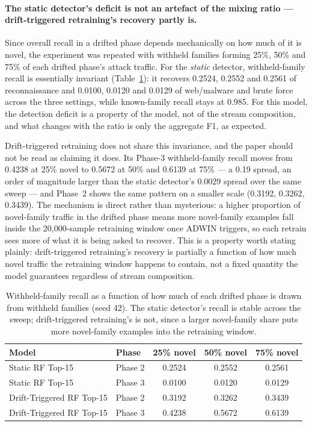 \documentclass[11pt,a4paper]{article}
\begin{document}
\paragraph{The static detector's deficit is not an artefact of the mixing
ratio --- drift-triggered retraining's recovery partly is.} Since overall
recall in a drifted phase depends mechanically on how much of it is novel, the
experiment was repeated with withheld families forming 25\%, 50\% and 75\% of
each drifted phase's attack traffic. For the \emph{static} detector,
withheld-family recall is essentially invariant (Table~\ref{tab:sweep}): it
recovers 0.2524, 0.2552 and 0.2561 of reconnaissance and 0.0100, 0.0120 and
0.0129 of web/malware and brute force across the three settings, while
known-family recall stays at 0.985. For this model, the detection deficit is a
property of the model, not of the stream composition, and what changes with
the ratio is only the aggregate F1, as expected.

Drift-triggered retraining does not share this invariance, and the paper
should not be read as claiming it does. Its Phase-3 withheld-family recall
moves from 0.4238 at 25\% novel to 0.5672 at 50\% and 0.6139 at 75\% --- a
0.19 spread, an order of magnitude larger than the static detector's 0.0029
spread over the same sweep --- and Phase~2 shows the same pattern on a smaller
scale (0.3192, 0.3262, 0.3439). The mechanism is direct rather than
mysterious: a higher proportion of novel-family traffic in the drifted phase
means more novel-family examples fall inside the 20{,}000-sample retraining
window once ADWIN triggers, so each retrain sees more of what it is being
asked to recover. This is a property worth stating plainly: drift-triggered
retraining's recovery is partially a function of how much novel traffic the
retraining window happens to contain, not a fixed quantity the model
guarantees regardless of stream composition.

\begin{table}[!ht]
\centering
\caption{Withheld-family recall as a function of how much of each drifted phase
is drawn from withheld families (seed 42). The static detector's recall is
stable across the sweep; drift-triggered retraining's is not, since a larger
novel-family share puts more novel-family examples into the retraining
window.}
\label{tab:sweep}
\small
\begin{tabular}{llccc}
\toprule
\textbf{Model} & \textbf{Phase} & \textbf{25\% novel} & \textbf{50\% novel} & \textbf{75\% novel} \\
\midrule
Static RF Top-15           & Phase 2 & 0.2524 & 0.2552 & 0.2561 \\
Static RF Top-15           & Phase 3 & 0.0100 & 0.0120 & 0.0129 \\
Drift-Triggered RF Top-15  & Phase 2 & 0.3192 & 0.3262 & 0.3439 \\
Drift-Triggered RF Top-15  & Phase 3 & 0.4238 & 0.5672 & 0.6139 \\
\bottomrule
\end{tabular}
\end{table}
\end{document}
